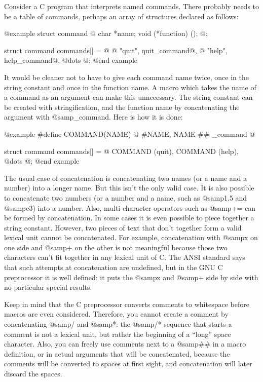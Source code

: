 {Consider a C program that interprets named commands.  There probably needs
to be a table of commands, perhaps an array of structures declared as
follows:

@example
struct command
@{
  char *name;
  void (*function) ();
@};

struct command commands[] =
@{
  @{ "quit", quit_command@},
  @{ "help", help_command@},
  @dots{}
@};
@end example

It would be cleaner not to have to give each command name twice, once in
the string constant and once in the function name.  A macro which takes the
name of a command as an argument can make this unnecessary.  The string
constant can be created with stringification, and the function name by
concatenating the argument with @samp{_command}.  Here is how it is done:

@example
#define COMMAND(NAME)  @{ #NAME, NAME ## _command @}

struct command commands[] =
@{
  COMMAND (quit),
  COMMAND (help),
  @dots{}
@};
@end example

The usual case of concatenation is concatenating two names (or a name and a
number) into a longer name.  But this isn't the only valid case.  It is
also possible to concatenate two numbers (or a number and a name, such as
@samp{1.5} and @samp{e3}) into a number.  Also, multi-character operators
such as @samp{+=} can be formed by concatenation.  In some cases it is even
possible to piece together a string constant.  However, two pieces of text
that don't together form a valid lexical unit cannot be concatenated.  For
example, concatenation with @samp{x} on one side and @samp{+} on the other
is not meaningful because those two characters can't fit together in any
lexical unit of C.  The ANSI standard says that such attempts at
concatenation are undefined, but in the GNU C preprocessor it is well
defined: it puts the @samp{x} and @samp{+} side by side with no particular
special results.

Keep in mind that the C preprocessor converts comments to whitespace before
macros are even considered.  Therefore, you cannot create a comment by
concatenating @samp{/} and @samp{*}: the @samp{/*} sequence that starts a
comment is not a lexical unit, but rather the beginning of a ``long'' space
character.  Also, you can freely use comments next to a @samp{##} in a
macro definition, or in actual arguments that will be concatenated, because
the comments will be converted to spaces at first sight, and concatenation
will later discard the spaces.

}
